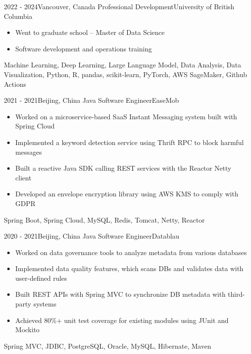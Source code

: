 \begin{experiences}

\experience
{2022 - 2024}{Vancouver, Canada}
{Professional Development}{University of British Columbia}
{
    \begin{itemize}
    \item Went to graduate school -- Master of Data Science
    \item Software development and operations training
    \end{itemize}
}
{Machine Learning, Deep Learning, Large Language Model, Data Analysis, Data Visualization, Python, R, pandas, scikit-learn, PyTorch, AWS SageMaker, Github Actions}

\emptySeparator

\experience
{2021 - 2021}{Beijing, China}
{Java Software Engineer}{EaseMob}
{
    \begin{itemize}
    \item Worked on a microservice-based SaaS Instant Messaging system built with Spring Cloud
    \item Implemented a keyword detection service using Thrift RPC to block harmful messages
    \item Built a reactive Java SDK calling REST services with the Reactor Netty client
    \item Developed an envelope encryption library using AWS KMS to comply with GDPR
    \end{itemize}
}
{Spring Boot, Spring Cloud, MySQL, Redis, Tomcat, Netty, Reactor}

\emptySeparator

\experience
{2020 - 2021}{Beijing, China}
{Java Software Engineer}{Datablau}
{
    \begin{itemize}
    \item Worked on data governance tools to analyze metadata from various databases
    \item Implemented data quality features, which scans DBs and validates data with user-defined rules
    \item Built REST APIs with Spring MVC to synchronize DB metadata with third-party systems
    \item Achieved 80\%+ unit test coverage for existing modules using JUnit and Mockito
    \end{itemize}
}
{Spring MVC, JDBC, PostgreSQL, Oracle, MySQL, Hibernate, Maven}

\emptySeparator


\end{experiences}
